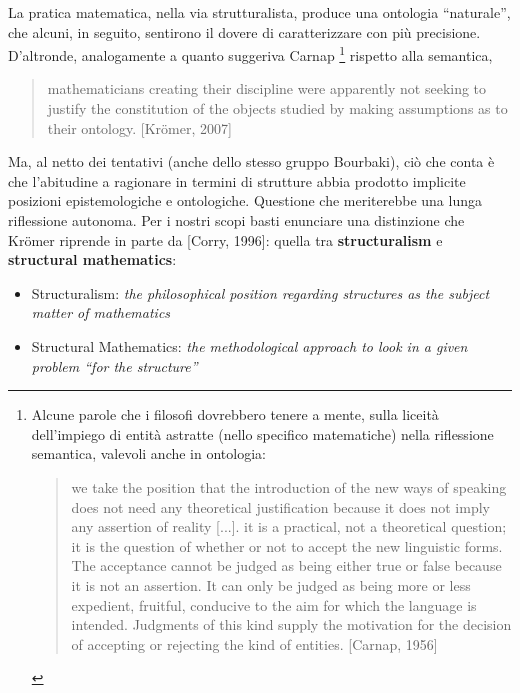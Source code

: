 \documentclass[a4paper, 11pt]{article}
\begin{document}
		
		La pratica matematica, nella via strutturalista, produce una ontologia ``naturale'', che alcuni, in seguito, sentirono il dovere di caratterizzare con più precisione. D'altronde, analogamente a quanto suggeriva Carnap \footnote{Alcune parole che i filosofi dovrebbero tenere a mente, sulla liceità dell'impiego di entità astratte (nello specifico matematiche) nella riflessione semantica, valevoli anche in ontologia:
		\begin{quote}
			we take the position that
			the introduction of the new ways of speaking does not need any theoretical justification
			because it does not imply any assertion of reality [...].  it is a
			practical, not a theoretical question; it is the question of whether or not to accept the new
			linguistic forms. The acceptance cannot be judged as being either true or false because it is
			not an assertion. It can only be judged as being more or less expedient, fruitful, conducive to
			the aim for which the language is intended. Judgments of this kind supply the motivation for
			the decision of accepting or rejecting the kind of entities. [Carnap, 1956]
	\end{quote}} rispetto alla semantica,
	\begin{quotation}
		mathematicians creating
		their discipline were apparently not seeking to justify the constitution of the
		objects studied by making assumptions as to their ontology. [Kr\"omer, 2007]
	\end{quotation}
	Ma, al netto dei tentativi (anche dello stesso gruppo Bourbaki), ciò che conta è che l'abitudine a ragionare in termini di strutture abbia prodotto implicite posizioni epistemologiche e ontologiche.
	Questione che meriterebbe una lunga riflessione autonoma. Per i nostri scopi basti enunciare una distinzione che Kr\"omer riprende in parte da [Corry, 1996]: quella tra \textbf{structuralism} e \textbf{structural mathematics}:
	\begin{itemize}
		\item[\textbf{(1)}] Structuralism: \textit{the philosophical
			position regarding structures as the subject matter of mathematics}
		\item[\textbf{(2)}] Structural Mathematics: \textit{the methodological approach to look in a given problem
			“for the structure”}
	\end{itemize}
\end{document}
